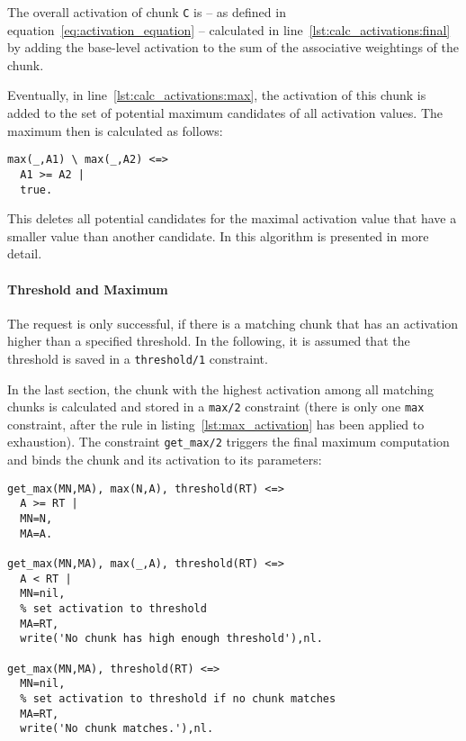 The overall activation of chunk \lstinline|C| is -- as defined in equation~\eqref{eq:activation_equation} -- calculated in line~\ref{lst:calc_activations:final} by adding the base-level activation to the sum of the associative weightings of the chunk.

Eventually, in line~\ref{lst:calc_activations:max}, the activation of this chunk is added to the set of potential maximum candidates of all activation values. The maximum then is calculated as follows:

\begin{lstlisting}[caption={Calculate highest activation of all matching chunks}, label=lst:max_activation]
max(_,A1) \ max(_,A2) <=> 
  A1 >= A2 |
  true.
\end{lstlisting}

This deletes all potential candidates for the maximal activation value that have a smaller value than another candidate. In \cite[19\psqq]{fru_chr_book_2009} this algorithm is presented in more detail.

\paragraph{Threshold and Maximum}

The request is only successful, if there is a matching chunk that has an activation higher than a specified threshold. In the following, it is assumed that the threshold is saved in a \lstinline|threshold/1| constraint.

In the last section, the chunk with the highest activation among all matching chunks is calculated and stored in a \lstinline|max/2| constraint (there is only one \lstinline|max| constraint, after the rule in listing~\ref{lst:max_activation} has been applied to exhaustion). The constraint \lstinline|get_max/2| triggers the final maximum computation and binds the chunk and its activation to its parameters:

\begin{lstlisting}
get_max(MN,MA), max(N,A), threshold(RT) <=> 
  A >= RT | 
  MN=N,
  MA=A.
  
get_max(MN,MA), max(_,A), threshold(RT) <=> 
  A < RT | 
  MN=nil,
  % set activation to threshold
  MA=RT,
  write('No chunk has high enough threshold'),nl.
  
get_max(MN,MA), threshold(RT) <=>
  MN=nil,
  % set activation to threshold if no chunk matches
  MA=RT,
  write('No chunk matches.'),nl.
\end{lstlisting}


